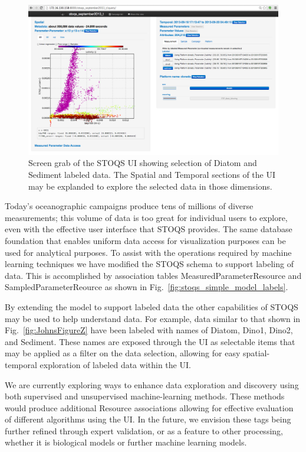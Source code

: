 \documentclass[conference]{IEEEtran}
\begin{document}
\begin{figure}[htbp]
\centering
\includegraphics[width=0.9\linewidth]{LabeledSelectionUI.png}
\caption{Screen grab of the STOQS UI showing selection of Diatom and Sediment labeled data. The Spatial and Temporal sections of the UI may be explanded to explore the selected data in those dimensions.}
\label{fig:LabeledSelectionUI}
\end{figure}

Today's oceanographic campaigns produce tens of millions of diverse measurements; this volume of data is too great for individual users to explore, even with the effective user interface that STOQS provides.  The same database foundation that enables uniform data access for visualization purposes can be used for analytical purposes. To assist with the operations required by machine learning techniques we have modified the STOQS schema to support labeling of data. This is accomplished by association tables MeasuredParameterResource and SampledParameterReource as shown in Fig.~\ref{fig:stoqs_simple_model_labels}.

By extending the model to support labeled data the other capabilities of STOQS may be used to help understand data. For example, data similar to that shown in Fig.~\ref{fig:JohnsFigureZ} have been labeled with names of Diatom, Dino1, Dino2, and Sediment. These names are exposed through the UI as selectable items that may be applied as a filter on the data selection, allowing for easy spatial-temporal exploration of labeled data within the UI.

We are currently exploring ways to enhance data exploration and discovery using both supervised and unsupervised machine-learning methods.  These methods would produce additional Resource associations allowing for effective evaluation of different algorithms using the UI.  In the future, we envision these tags being further refined through expert validation, or as a feature to other processing, whether it is biological models or further machine learning models. 
\end{document}
